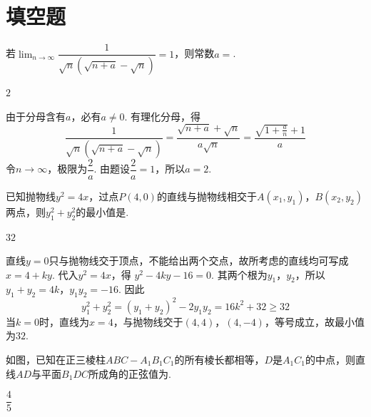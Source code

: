 \section{填空题}

\begin{problem}
若\(\displaystyle\lim_{n\to\infty}\dfrac{1}{\sqrt{n}\left(\sqrt{n+a}-\sqrt n\right)}=1\)，则常数\(a=\)\fillinblank{}.
\end{problem}

\begin{answer}
\(2\)
\end{answer}

\begin{solution}
由于分母含有\(a\)，必有\(a\ne0\). 有理化分母，得
\[
\frac{1}{\sqrt n\left(\sqrt{n+a}-\sqrt n\right)}
=\frac{\sqrt{n+a}+\sqrt n}{a\sqrt n}
=\frac{\sqrt{1+\frac an}+1}{a}
\]
令\(n\to\infty\)，极限为\(\dfrac2a\). 由题设\(\dfrac2a=1\)，所以\(a=2\).
\end{solution}

\begin{problem}
已知抛物线\(y^2=4x\)，过点\(P(4,0)\)的直线与抛物线相交于\(A(x_1,y_1)\)，\(B(x_2,y_2)\)两点，则\(y_1^2+y_2^2\)的最小值是\fillinblank{}.
\end{problem}

\begin{answer}
\(32\)
\end{answer}

\begin{solution}
直线\(y=0\)只与抛物线交于顶点，不能给出两个交点，故所考虑的直线均可写成\(x=4+ky\). 代入\(y^2=4x\)，得
\(y^2-4ky-16=0\).
其两个根为\(y_1\)，\(y_2\)，所以
\(y_1+y_2=4k\)，\(y_1y_2=-16\).
因此
\[
y_1^2+y_2^2=(y_1+y_2)^2-2y_1y_2
=16k^2+32\geqslant32
\]
当\(k=0\)时，直线为\(x=4\)，与抛物线交于\((4,4)\)，\((4,-4)\)，等号成立，故最小值为\(32\).
\end{solution}

\begin{problem}
如图，已知在正三棱柱\(ABC-A_1B_1C_1\)的所有棱长都相等，\(D\)是\(A_1C_1\)的中点，则直线\(AD\)与平面\(B_1DC\)所成角的正弦值为\fillinblank{}.

\end{problem}

\begin{answer}
\(\dfrac45\)
\end{answer}

